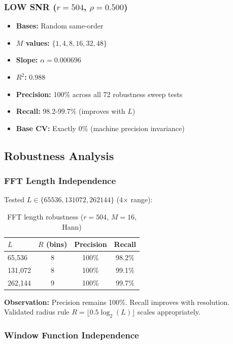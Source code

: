 \subsubsection{LOW SNR ($r=504$, $\rho=0.500$)}

\begin{itemize}
    \item \textbf{Bases:} Random same-order
    \item \textbf{$M$ values:} $\{1,4,8,16,32,48\}$
    \item \textbf{Slope:} $\alpha = 0.000696$
    \item \textbf{$R^2$:} 0.988
    \item \textbf{Precision:} 100\% across all 72 robustness sweep tests
    \item \textbf{Recall:} 98.2-99.7\% (improves with $L$)
    \item \textbf{Base CV:} Exactly $0\%$ (machine precision invariance)
\end{itemize}

\subsection{Robustness Analysis}

\subsubsection{FFT Length Independence}

Tested $L \in \{65536, 131072, 262144\}$ (4× range):

\begin{table}[h]
\centering
\begin{tabular}{@{}lccc@{}}
\toprule
$L$ & $R$ (bins) & Precision & Recall \\
\midrule
65,536 & 8 & 100\% & 98.2\% \\
131,072 & 8 & 100\% & 99.1\% \\
262,144 & 9 & 100\% & 99.7\% \\
\bottomrule
\end{tabular}
\caption{FFT length robustness ($r=504$, $M=16$, Hann)}
\end{table}

\textbf{Observation:} Precision remains 100\%. Recall improves with resolution. Validated radius rule $R = \lfloor 0.5 \log_2(L) \rfloor$ scales appropriately.

\subsubsection{Window Function Independence}

